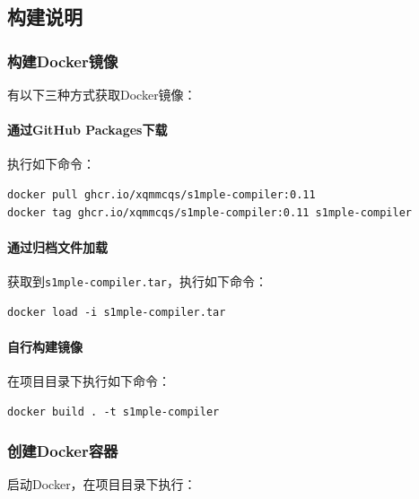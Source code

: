 \documentclass[lang=cn,11pt,a4paper,cite=authornum]{paper}
\begin{document}
\subsection{构建说明}

\subsubsection{构建Docker镜像}

有以下三种方式获取Docker镜像：

\paragraph{通过GitHub Packages下载} 执行如下命令：

\begin{code}
    \begin{verbatim}
docker pull ghcr.io/xqmmcqs/s1mple-compiler:0.11
docker tag ghcr.io/xqmmcqs/s1mple-compiler:0.11 s1mple-compiler
\end{verbatim}
\end{code}

\paragraph{通过归档文件加载} 获取到\texttt{s1mple-compiler.tar}，执行如下命令：

\begin{code}
    \begin{verbatim}
docker load -i s1mple-compiler.tar
\end{verbatim}
\end{code}

\paragraph{自行构建镜像} 在项目目录下执行如下命令：

\begin{code}
    \begin{verbatim}
docker build . -t s1mple-compiler
\end{verbatim}
\end{code}

\subsubsection{创建Docker容器}

启动Docker，在项目目录下执行：
\end{document}
